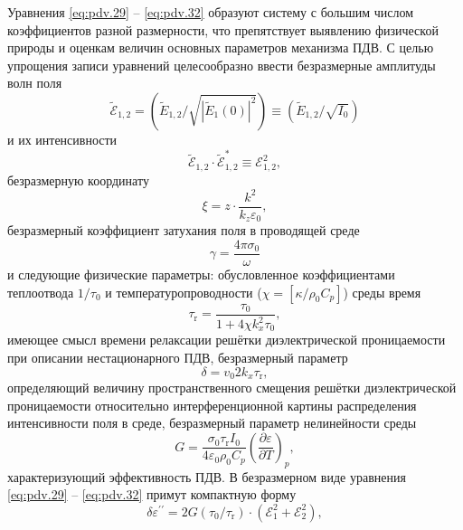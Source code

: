 Уравнения \eqref{eq:pdv.29} -- \eqref{eq:pdv.32} образуют систему с большим числом коэффициентов разной размерности, что препятствует выявлению физической природы и
оценкам величин основных параметров механизма ПДВ. С целью упрощения
записи уравнений целесообразно ввести безразмерные амплитуды волн поля
\begin{equation}
	\label{eq:pdv.33}
	\tilde{\mathcal{E}}_{1,2}=\left(\tilde{E}_{1,2} / \sqrt{\left|\tilde{E}_{1}(0)\right|^{2}}\right) \equiv\left(\tilde{E}_{1,2} / \sqrt{I_{0}}\right)
\end{equation}
и их интенсивности 
\begin{equation}
	\label{eq:pdv.34}
	\tilde{\mathcal{E}}_{1,2} \cdot \tilde{\mathcal{E}}_{1,2}^* \equiv \mathcal{E}_{1,2}^{2},
\end{equation}
безразмерную координату
\begin{equation}
	\label{eq:pdv.35}
	\xi = z \cdot \frac{k^2}{k_z \varepsilon_0},
\end{equation}
безразмерный коэффициент затухания поля в проводящей среде
\begin{equation}
	\label{eq:pdv.36}
	\gamma = \frac{4\pi \sigma_0}{\omega}
\end{equation}
и следующие физические параметры: обусловленное коэффициентами теплоотвода $1/\tau_0$ и температуропроводности ($\chi = [\kappa / \rho_0 C_p]$) среды время
\begin{equation}
	\label{eq:pdv.37}
	\tau_\text{r} = \frac{\tau_0}{1+4\chi k_x^2 \tau_0},
\end{equation}
имеющее смысл времени релаксации решётки диэлектрической проницаемости
при описании нестационарного ПДВ, безразмерный параметр
\begin{equation}
	\label{eq:pdv.38}
	\delta = v_0 2 k_x \tau_\text{r},
\end{equation}
определяющий величину пространственного смещения решётки диэлектрической проницаемости относительно интерференционной картины распределения
интенсивности поля в среде, безразмерный параметр нелинейности среды
\begin{equation}
	\label{eq:pdv.39}
	G = \frac{\sigma_0 \tau_\text{r} I_0}{4 \varepsilon_0 \rho_0 C_p} \left(\frac{\partial \varepsilon}{\partial T}\right)_p,
\end{equation}
характеризующий эффективность ПДВ. В безразмерном виде уравнения \eqref{eq:pdv.29} -- \eqref{eq:pdv.32} примут компактную форму
\begin{equation}
	\label{eq:pdv.40}
	\delta \varepsilon^{\prime \prime}=2 G\left(\tau_{0} / \tau_{\mathrm{r}}\right) \cdot\left({\mathcal { E }}_{1}^{2}+\mathcal{E}_{2}^{2}\right), 
\end{equation}
